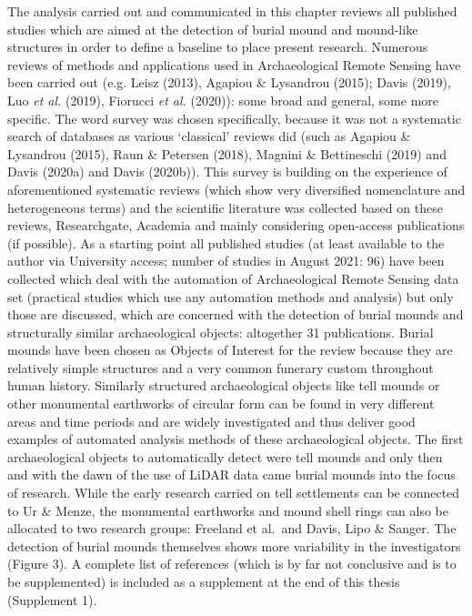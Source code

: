 \documentclass[
  12pt,
]{article}
\begin{document}
The analysis carried out and communicated in this chapter reviews all published studies which are aimed at the detection of burial mound and mound-like structures in order to define a baseline to place present research. Numerous reviews of methods and applications used in Archaeological Remote Sensing have been carried out (e.g. Leisz (2013), Agapiou \& Lysandrou (2015); Davis (2019), Luo \emph{et al.} (2019), Fiorucci \emph{et al.} (2020)): some broad and general, some more specific. The word survey was chosen specifically, because it was not a systematic search of databases as various `classical' reviews did (such as Agapiou \& Lysandrou (2015), Raun \& Petersen (2018), Magnini \& Bettineschi (2019) and Davis (2020a) and Davis (2020b)).
This survey is building on the experience of aforementioned systematic reviews (which show very diversified nomenclature and heterogeneous terms) and the scientific literature was collected based on these reviews, Researchgate, Academia and mainly considering open-access publications (if possible). As a starting point all published studies (at least available to the author via University access; number of studies in August 2021: 96) have been collected which deal with the automation of Archaeological Remote Sensing data set (practical studies which use any automation methods and analysis) but only those are discussed, which are concerned with the detection of burial mounds and structurally similar archaeological objects: altogether 31 publications. Burial mounds have been chosen as Objects of Interest for the review because they are relatively simple structures and a very common funerary custom throughout human history. Similarly structured archaeological objects like tell mounds or other monumental earthworks of circular form can be found in very different areas and time periods and are widely investigated and thus deliver good examples of automated analysis methods of these archaeological objects. The first archaeological objects to automatically detect were tell mounds and only then and with the dawn of the use of LiDAR data came burial mounds into the focus of research. While the early research carried on tell settlements can be connected to Ur \& Menze, the monumental earthworks and mound shell rings can also be allocated to two research groups: Freeland et al.~and Davis, Lipo \& Sanger. The detection of burial mounds themselves shows more variability in the investigators (Figure 3). A complete list of references (which is by far not conclusive and is to be supplemented) is included as a supplement at the end of this thesis (Supplement 1).
\end{document}
